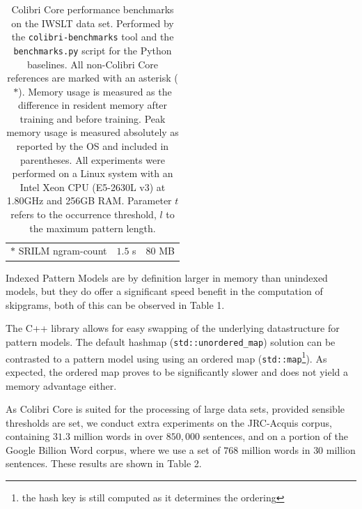 \begin{table}[h]
{{\begin{tabular}{lll}
$\ast$ SRILM ngram-count & $1.5$ s & $80$ MB  \\
\end{tabular}}
\caption{Colibri Core performance benchmarks on the IWSLT data set. Performed by the \texttt{colibri-benchmarks} tool and the
\texttt{benchmarks.py} script for the Python baselines. All non-Colibri Core
references are marked with an asterisk ($\ast$). Memory usage is measured as the difference in resident memory after training
and before training. Peak memory usage is measured absolutely as reported by
the OS and included in parentheses. All experiments were performed on a Linux system
with an Intel Xeon CPU (E5-2630L v3) at 1.80GHz and 256GB RAM. Parameter $t$ refers to the occurrence threshold, $l$ to the maximum pattern length.
}
}
\label{tab:benchmarks}
\end{table}

Indexed Pattern Models are by definition larger in memory than unindexed
models, but they do offer a significant speed benefit in the computation of
skipgrams, both of this can be observed in Table 1.

The C++ library allows for easy swapping of the underlying datastructure for
pattern models. The default hashmap (\texttt{std::unordered\_map}) solution can
be contrasted to a pattern model using using an ordered map
(\texttt{std::map}\footnote{the hash key is still computed as it determines the
ordering}). As expected, the ordered map proves to be significantly slower and
does not yield a memory advantage either.

As Colibri Core is suited for the processing of large data sets, provided sensible
thresholds are set, we conduct extra experiments on the JRC-Acquis corpus,
containing $31.3$ million words in over $850,000$ sentences, and on a portion
of the Google Billion Word corpus, where we use a set of $768$ million words in
$30$ million sentences. These results are shown in Table 2.


